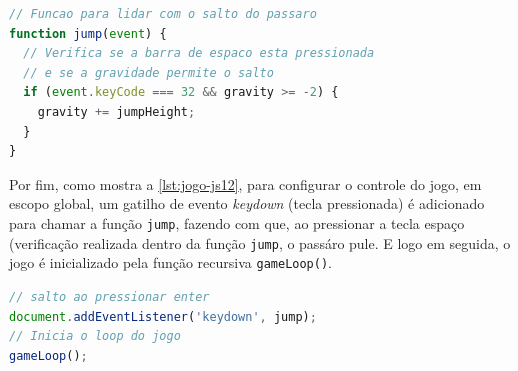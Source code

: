 \begin{lstlisting}[language=TypeScript, caption={Projeto exemplo em JS (Parte 11): Função de pulo}, label=lst:jogo-js11]
// Funcao para lidar com o salto do passaro
function jump(event) {
  // Verifica se a barra de espaco esta pressionada
  // e se a gravidade permite o salto
  if (event.keyCode === 32 && gravity >= -2) {
    gravity += jumpHeight;
  }
}
\end{lstlisting}

Por fim, como mostra a \autoref{lst:jogo-js12}, para configurar o controle do jogo, em escopo global, um gatilho de evento \textit{keydown} (tecla pressionada) é adicionado para chamar a função \texttt{jump}, fazendo com que, ao pressionar a tecla espaço (verificação realizada dentro da função \texttt{jump}, o passáro pule. E logo em seguida, o jogo é inicializado pela função recursiva \texttt{gameLoop()}.

\begin{lstlisting}[language=TypeScript, caption={Projeto exemplo em JS (Parte 12): Inicialização do jogo e evento de pulo ao pressionar enter}, label=lst:jogo-js12]
// salto ao pressionar enter
document.addEventListener('keydown', jump);
// Inicia o loop do jogo
gameLoop();
\end{lstlisting}

